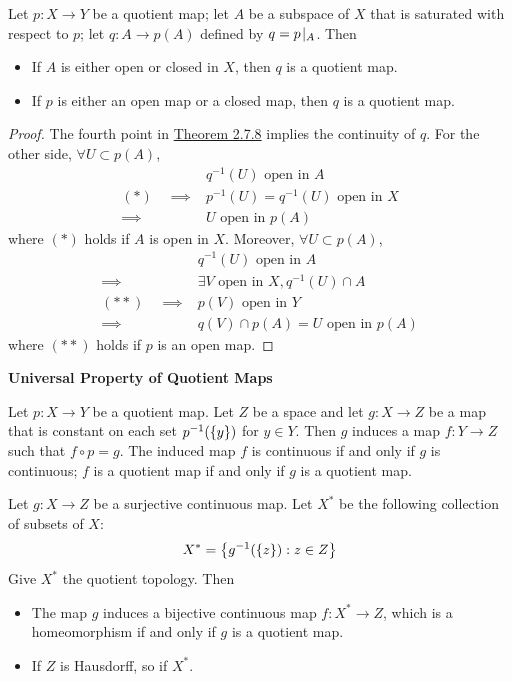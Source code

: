 \documentclass[12pt,a4paper]{article}
\begin{document}
    \begin{thm}
        Let $p:X\to Y$ be a quotient map; let $A$ be a subspace of $X$ that is saturated with respect to $p$; let $q:A\to p(A)$ defined by $q=p\!\mid_{A}$. Then
        \begin{itemize}
            \item If $A$ is either open or closed in $X$, then $q$ is a quotient map.
            \item If $p$ is either an open map or a closed map, then $q$ is a quotient map.
        \end{itemize}
    \end{thm}
    \begin{proof}
        The fourth point in \hyperref[2.7.8]{Theorem 2.7.8} implies the continuity of $q$. For the other side, $\forall U\subset p(A)$,
        $$
        \begin{aligned}
            &q^{-1}(U)\text{ open in }A
            \\(*)\quad\implies&p^{-1}(U)=q^{-1}(U)\text{ open in }X
            \\\implies&U\text{ open in }p(A)
        \end{aligned}
        $$
        where $(*)$ holds if $A$ is open in $X$. Moreover, $\forall U\subset p(A)$,
        $$
        \begin{aligned}
            &q^{-1}(U)\text{ open in }A
            \\\implies& \exists V\text{ open in }X,q^{-1}(U)\cap A
            \\(**)\quad\implies& p(V)\text{ open in }Y
            \\\implies& q(V)\cap p(A)=U\text{ open in }p(A)
        \end{aligned}
        $$
        where $(**)$ holds if $p$ is an open map.
    \end{proof}
    \hfill

    \begin{thm}\textbf{{Universal Property of Quotient Maps}}\hfill\label{2.10.7}
    
        Let $p:X\to Y$ be a quotient map. Let $Z$ be a space and let $g:X\to Z$ be a map that is constant on each set $p^{-1}(\left\{y\right\})$ for $y\in Y$. Then $g$ induces a map $f:Y\to Z$ such that $f\circ p=g$. The induced map $f$ is continuous if and only if $g$ is continuous; $f$ is a quotient map if and only if $g$ is a quotient map.
    \end{thm}
    \begin{cor}
        Let $g:X\to Z$ be a surjective continuous map. Let $X^*$ be the following collection of subsets of $X$:
        $$
        X^*=\left\{g^{-1}(\left\{z\right\}):z\in Z\right\}
        $$
        Give $X^*$ the quotient topology. Then
        \begin{itemize}
            \item The map $g$ induces a bijective continuous map $f:X^*\to Z$, which is a homeomorphism if and only if $g$ is a quotient map. 
            \item If $Z$ is Hausdorff, so if $X^*$.
        \end{itemize}
    \end{cor}
    \hfill
\end{document}
